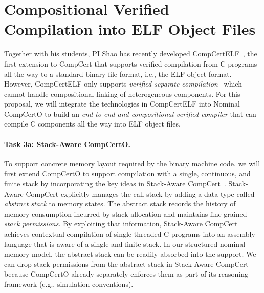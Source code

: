 \section{Compositional Verified Compilation into ELF Object Files} \label{sec:compcertelf}

Together with his students, PI Shao has recently developed
CompCertELF~\cite{compcertelf20}, the first extension to CompCert that
supports verified compilation from C programs all the way to a
standard binary file format, i.e., the ELF object format.  However,
CompCertELF only supports {\em{}verified separate
compilation}~\cite{sepcompcert} which cannot handle compositional linking of
heterogeneous components.  For this proposal, we will integrate the
technologies in CompCertELF into Nominal CompCertO to build an {\em
  end-to-end and compositional verified compiler} that can compile C
components all the way into ELF object files.

\vspace*{-2ex}
\paragraph*{Task 3a: Stack-Aware CompCertO.}
To support concrete memory layout required by the binary machine code,
we will first extend CompCertO to support compilation with a
single, continuous, and finite stack by incorporating the key ideas in
Stack-Aware CompCert~\cite{wang2019,compcertelf20}.  Stack-Aware
CompCert explicitly manages the call stack by adding a data type
called \emph{abstract stack} to memory states. The abstract stack
records the history of memory consumption incurred by stack allocation
and maintains fine-grained \emph{stack permissions}. By exploiting
that information, Stack-Aware CompCert achieves contextual compilation
of single-threaded C programs into an assembly language that is aware
of a single and finite stack.  In our structured nominal memory model,
the abstract stack can be readily absorbed into the support. We can
drop stack permissions from the abstract stack in Stack-Aware CompCert
because CompCertO already separately enforces them as part of its
reasoning framework (e.g., simulation conventions).


